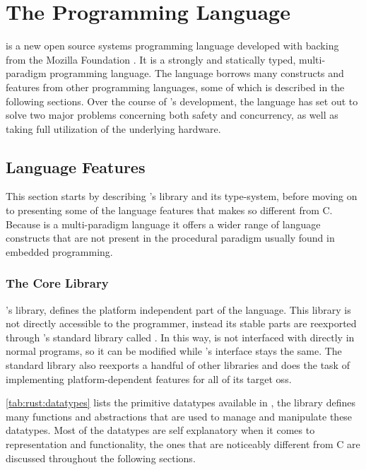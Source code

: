 
\section{The {\rust} Programming Language} %
\label{sub:the_rust_programming_language}

\rust \cite{web:rust_lang} is a new open source systems programming language developed with backing from the Mozilla Foundation \cite{web:mozilla_foundation}.
It is a strongly and statically typed, multi-paradigm programming language.
The language borrows many constructs and features from other programming languages, some of which is described in the following sections.
Over the course of {\rust}'s development, the language has set out to solve two major problems concerning both safety and concurrency, as well as taking full utilization of the underlying hardware.

\subsection{Language Features}
\label{ssub:rust:features}

This section starts by describing {\rust}'s {\core} library and its type-system, before moving on to presenting some of the language features that makes {\rust} so different from C.
Because {\rust} is a multi-paradigm language it offers a wider range of language constructs that are not present in the procedural paradigm usually found in embedded programming.

\subsubsection{The Core Library}

\rust's {\core} library, defines the platform independent part of the language.
This library is not directly accessible to the programmer, instead its stable parts are reexported through {\rust}'s standard library called {\std}.
In this way, {\core} is not interfaced with directly in normal {\rust} programs, so it can be modified while {\std}'s interface stays the same.
The standard library also reexports a handful of other libraries and does the task of implementing platform-dependent features for all of its target \glspl{os}.

\autoref{tab:rust:datatypes} lists the primitive datatypes available in {\rust}, the {\core} library defines many functions and abstractions that are used to manage and manipulate these datatypes.
Most of the datatypes are self explanatory when it comes to representation and functionality, the ones that are noticeably different from C are discussed throughout the following sections.

